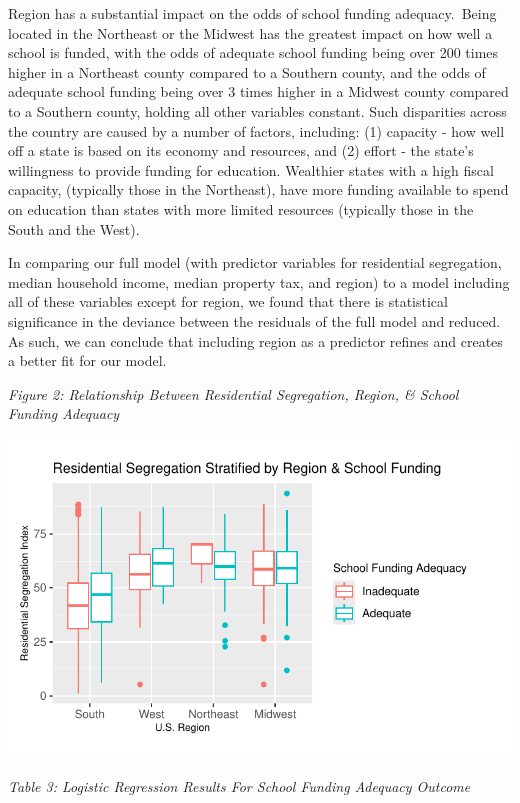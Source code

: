 \documentclass[
  10pt,
  letterpaper,
  DIV=11,
  numbers=noendperiod]{scrartcl}
\begin{document}
Region has a substantial impact on the odds of school funding
adequacy.~Being located in the Northeast or the Midwest has the greatest
impact on how well a school is funded, with the odds of adequate school
funding being over 200 times higher in a Northeast county compared to a
Southern county, and the odds of adequate school funding being over 3
times higher in a Midwest county compared to a Southern county, holding
all other variables constant. Such disparities across the country are
caused by a number of factors, including: (1) capacity - how well off a
state is based on its economy and resources, and (2) effort - the
state's willingness to provide funding for education. Wealthier states
with a high fiscal capacity, (typically those in the Northeast), have
more funding available to spend on education than states with more
limited resources (typically those in the South and the West).~

In comparing our full model (with predictor variables for residential
segregation, median household income, median property tax, and region)
to a model including all of these variables except for region, we found
that there is statistical significance in the deviance between the
residuals of the full model and reduced. As such, we can conclude that
including region as a predictor refines and creates a better fit for our
model.

\emph{Figure 2: Relationship Between Residential Segregation, Region, \&
School Funding Adequacy}

\includegraphics{paper_files/figure-pdf/unnamed-chunk-22-1.pdf}

\emph{Table 3: Logistic Regression Results For School Funding Adequacy
Outcome}
\end{document}
